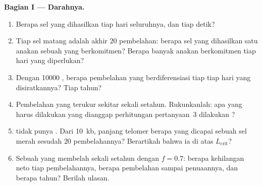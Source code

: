 \begin{problem}
\medskip
\noindent\textbf{Bagian I --- Darahnya.}
\begin{enumerate}
  \item Berapa sel yang dihasilkan tiap hari seluruhnya, dan tiap detik?
  \item Tiap sel matang adalah akhir $20$ pembelahan: berapa sel
        yang dihasilkan satu anakan sebuah  yang berkomitmen? Berapa banyak
        anakan berkomitmen tiap hari yang diperlukan?
  \item Dengan \num{10000} , berapa pembelahan yang berdiferensiasi
        tiap  tiap hari yang disiratkannya? Tiap tahun?
  \item Pembelahan  yang terukur sekitar sekali setahun. Rukunkanlah:
        apa yang harus dilakukan  yang dianggap perhitungan
        pertanyaan~3 dilakukan ?
  \item {} tidak punya . Dari \qty{10}{kb}, panjang telomer
        berapa yang dicapai sebuah  sel merah sesudah $20$ pembelahannya?
        Berartikah bahwa ia di atas $L_{\text{crit}}$?
  \item Sebuah  yang membelah sekali setahun dengan $f = 0.7$: berapa kehilangan neto tiap
        pembelahannya, berapa pembelahan sampai penuaannya, dan berapa tahun? Berilah ulasan.
\end{enumerate}


\end{problem}
